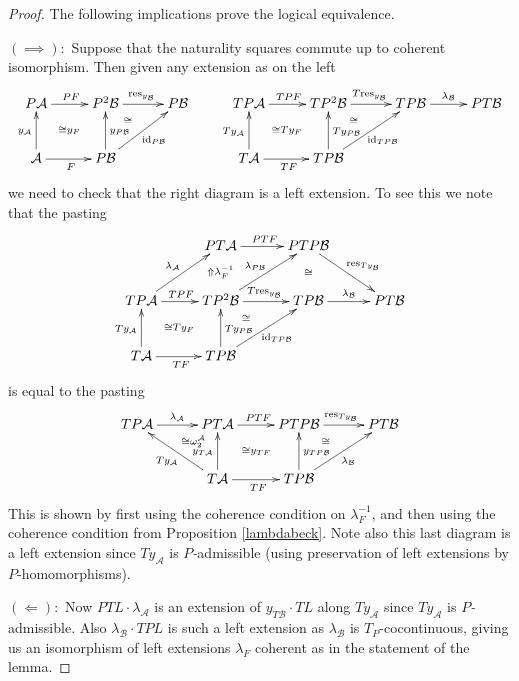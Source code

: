 \documentclass[a4paper,oneside,english]{amsart}
\numberwithin{equation}{section}
\numberwithin{figure}{section}
\theoremstyle{plain}
\theoremstyle{definition}
\theoremstyle{remark}
\theoremstyle{definition}
\theoremstyle{plain}
\theoremstyle{plain}
\theoremstyle{plain}
\begin{document}
\begin{proof}
The following implications prove the logical equivalence.

$\left(\implies\right)\colon$ Suppose that the naturality squares
commute up to coherent isomorphism. Then given any extension as on
the left
\[
\xymatrix@=1em{P\mathcal{A}\ar[rr]^{PF}\ar@{}[rrdd]|-{\cong y_{F}} &  & P^{2}\mathcal{B}\ar[rr]^{\textnormal{res}_{y_{\mathcal{B}}}} &  & P\mathcal{B} &  & TP\mathcal{A}\ar[rr]^{TPF}\ar@{}[rrdd]|-{\cong Ty_{F}} &  & TP^{2}\mathcal{B}\ar[rr]^{T\textnormal{res}_{y_{\mathcal{B}}}} &  & TP\mathcal{B}\ar[rr]^{\lambda_{\mathcal{B}}} &  & PT\mathcal{B}\\
 &  &  & \;\ar@{}[ul]|-{\cong} &  &  &  &  &  & \;\ar@{}[ul]|-{\cong}\\
\mathcal{A}\ar[uu]^{y_{\mathcal{A}}}\ar[rr]_{F} &  & P\mathcal{B}\ar[uu]_{y_{P\mathcal{B}}}\ar[uurr]_{\textnormal{id}_{P\mathcal{B}}} &  &  &  & T\mathcal{A}\ar[uu]^{Ty_{\mathcal{A}}}\ar[rr]_{TF} &  & TP\mathcal{B}\ar[uu]_{Ty_{P\mathcal{B}}}\ar[uurr]_{\textnormal{id}_{TP\mathcal{B}}}
}
\]
we need to check that the right diagram is a left extension. To see
this we note that the pasting
\[
\xymatrix@=1em{ &  & PT\mathcal{A}\ar[rr]^{PTF}\ar@{}[dd]|-{\Uparrow\lambda_{F}^{-1}} &  & PTP\mathcal{B}\ar[ddrr]^{\textnormal{res}_{Ty_{\mathcal{B}}}}\ar@{}[dd]|-{\cong}\\
\\
TP\mathcal{A}\ar[rr]^{TPF}\ar@{}[rrdd]|-{\cong Ty_{F}}\ar[uurr]^{\lambda_{\mathcal{A}}} &  & TP^{2}\mathcal{B}\ar[rr]^{T\textnormal{res}_{y_{\mathcal{B}}}}\ar[uurr]^{\lambda_{P\mathcal{B}}} &  & TP\mathcal{B}\ar[rr]^{\lambda_{\mathcal{B}}} &  & PT\mathcal{B}\\
 &  &  & \;\ar@{}[ul]|-{\cong}\\
T\mathcal{A}\ar[uu]^{Ty_{\mathcal{A}}}\ar[rr]_{TF} &  & TP\mathcal{B}\ar[uu]_{Ty_{P\mathcal{B}}}\ar[uurr]_{\textnormal{id}_{TP\mathcal{B}}}
}
\]
is equal to the pasting
\[
\xymatrix@=1em{TP\mathcal{A}\ar[rr]^{\lambda_{\mathcal{A}}} &  & PT\mathcal{A}\ar[rr]^{PTF}\ar@{}[rdrd]|-{\cong y_{TF}} &  & PTP\mathcal{B}\ar[rr]^{\textnormal{res}_{Ty_{\mathcal{B}}}} &  & PT\mathcal{B}\\
 & \;\ar@{}[ur]|-{\cong\omega_{2}^{\mathcal{A}}} &  &  &  & \;\ar@{}[ul]|-{\cong}\\
 &  & T\mathcal{A}\ar[rr]_{TF}\ar[uu]^{y_{T\mathcal{A}}}\ar[uull]^{Ty_{\mathcal{A}}} &  & TP\mathcal{B}\ar[uu]_{y_{TP\mathcal{B}}}\ar[rruu]_{\lambda_{\mathcal{B}}}
}
\]
This is shown by first using the coherence condition on $\lambda_{F}^{-1}$,
and then using the coherence condition from Proposition \ref{lambdabeck}.
Note also this last diagram is a left extension since $Ty_{\mathcal{A}}$
is \emph{$P$-}admissible (using preservation of left extensions by
$P$-homomorphisms). 

$\left(\Longleftarrow\right)\colon$ Now $PTL\cdot\lambda_{\mathcal{A}}$
is an extension of $y_{T\mathcal{B}}\cdot TL$ along $Ty_{\mathcal{A}}$
since $Ty_{\mathcal{A}}$ is \emph{$P$-}admissible. Also $\lambda_{\mathcal{B}}\cdot TPL$
is such a left extension as $\lambda_{\mathcal{B}}$ is $T_{P}$-cocontinuous,
giving us an isomorphism of left extensions $\lambda_{F}$ coherent
as in the statement of the lemma.\end{proof}
\end{document}
